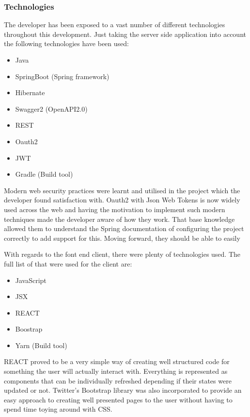 \subsubsection*{Technologies}
The developer has been exposed to a vast number of different technologies throughout this development.
Just taking the server side application into account the following technologies have been used:
\begin{itemize}
    \tightlist
    \item Java
    \item SpringBoot (Spring framework)
    \item Hibernate
    \item Swagger2 (OpenAPI2.0)
    \item REST
    \item Oauth2 
    \item JWT
    \item Gradle (Build tool)
\end{itemize}

Modern web security practices were learnt and utilised in the project which the developer found satisfaction with.
Oauth2 with Json Web Tokens is now widely used across the web and having the motivation to implement such modern techniques made the developer aware 
of how they work.
That base knowledge allowed them to understand the Spring documentation of configuring the project correctly to add support for this.
Moving forward, they should be able to easily 

With regards to the font end client, there were plenty of technologies used.
The full list of that were used for the client are: 
\begin{itemize}
    \tightlist
    \item JavaScript
    \item JSX
    \item REACT
    \item Boostrap
    \item Yarn (Build tool)
\end{itemize}

REACT proved to be a very simple way of creating well structured code for something the user will actually interact with.
Everything is represented as components that can be individually refreshed depending if their states were updated or not.
Twitter's Bootstrap library was also incorporated to provide an easy approach to creating well presented pages to the user without having to spend time
toying around with CSS.

